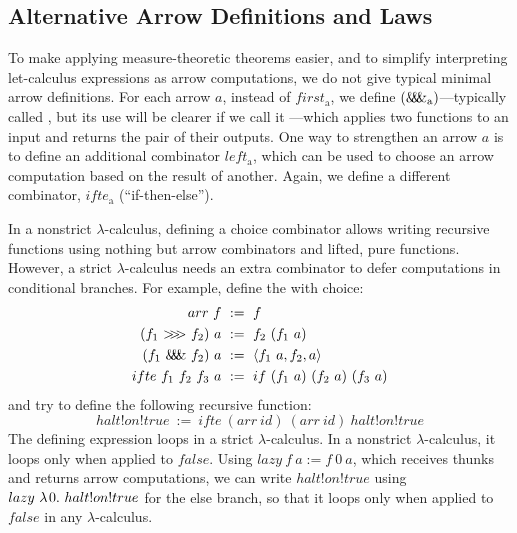 \documentclass{llncs}
\newcommand{\arrowarr}{\ensuremath{arr}}
\newcommand{\arrowcomp}{\ensuremath{{>}\mspace{-6mu}{>}\mspace{-6mu}{>}}}
\newcommand{\arrowpair}{\ensuremath{\mathit{\&\mspace{-7.5mu}\&\mspace{-7.5mu}\&}}}
\newcommand{\arrowif}{\ensuremath{ifte}}
\newcommand{\arrowlazy}{\ensuremath{lazy}}
\newcommand{\gen}{_\mathrm{a}}
\begin{document}
\subsection{Alternative Arrow Definitions and Laws}
\label{sec:arrow-definitions}

To make applying measure-theoretic theorems easier, and to simplify interpreting let-calculus expressions as arrow computations, we do not give typical minimal arrow definitions.
For each arrow $a$, instead of $first\gen$, we define $(\arrowpair\gen)$---typically called , but its use will be clearer if we call it ---which applies two functions to an input and returns the pair of their outputs.
One way to strengthen an arrow $a$ is to define an additional combinator $left\gen$, which can be used to choose an arrow computation based on the result of another.
Again, we define a different combinator, $\arrowif\gen$ (``if-then-else'').

In a nonstrict $\lambda$-calculus, defining a choice combinator allows writing recursive functions using nothing but arrow combinators and lifted, pure functions.
However, a strict $\lambda$-calculus needs an extra combinator to defer computations in conditional branches.
For example, define the  with choice:
\begin{equation}
\begin{aligned}
	\arrowarr~f &\ := \ f \\
	(f_1~\arrowcomp~f_2)~a &\ := \ f_2~(f_1~a) \\
	(f_1~\arrowpair~f_2)~a &\ := \ \pair{f_1~a,f_2,a} \\
	\arrowif~f_1~f_2~f_3~a &\ := \ if~(f_1~a)~(f_2~a)~(f_3~a) \\
\end{aligned}
\label{eqn:function-arrow}
\end{equation}
and try to define the following recursive function:
\begin{equation}
	halt!on!true \ := \ \arrowif~(\arrowarr~id)~(\arrowarr~id)~halt!on!true
\end{equation}
The defining expression loops in a strict $\lambda$-calculus.
In a nonstrict $\lambda$-calculus, it loops only when applied to $false$.
Using $\arrowlazy~f~a := f~0~a$, which receives thunks and returns arrow computations, we can write $halt!on!true$ using $\arrowlazy~\fun{0}{halt!on!true}$ for the else branch, so that it loops only when applied to $false$ in any $\lambda$-calculus.
\end{document}
